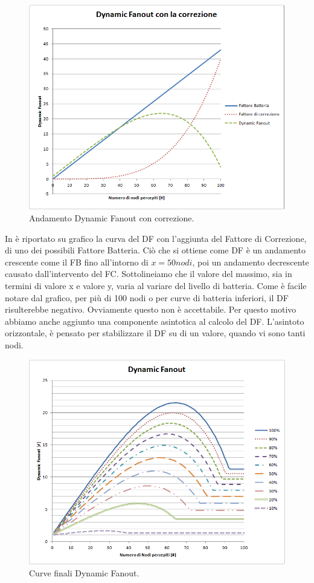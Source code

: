 \begin{figure}[t]
	\centering
	\includegraphics[width=0.9\linewidth]{Images/grafici_usati/DF_andamento_teorico}
	\caption[Andamento teorico DF]{Andamento Dynamic Fanout con correzione.}
	\label{fig:DF_andamento_teorico}
\end{figure}

In  è riportato su grafico la curva del DF con l'aggiunta del Fattore di Correzione, di uno dei possibili Fattore Batteria. Ciò che si ottiene come DF è un andamento crescente come il FB fino all'intorno di $\textit{x}=50 nodi$, poi un andamento decrescente causato dall'intervento del FC. Sottolineiamo che il valore del massimo, sia in termini di valore x e valore y, varia al variare del livello di batteria. Come è facile notare dal grafico, per più di 100 nodi o per curve di batteria inferiori, il DF risulterebbe negativo. Ovviamente questo non è accettabile. Per questo motivo abbiamo anche aggiunto una componente asintotica al calcolo del DF. L'asintoto orizzontale, è pensato per stabilizzare il DF su di un valore, quando vi sono tanti nodi.

\begin{figure}[t]
	\centering
	\includegraphics[width=0.9\linewidth]{Images/grafici_usati/DF_tot_no_arr}
	\caption[DF finale (continuo)]{Curve finali Dynamic Fanout.}
	\label{fig:DF_tot_no_arr}
\end{figure}


